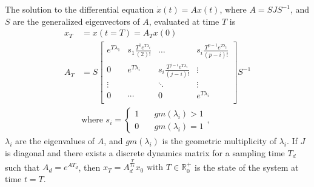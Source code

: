 \documentclass[sigconf]{llncs}
\newcommand{\mat}[1]{{#1}}
\renewcommand{\vec}[1]{{#1}}
\begin{document}
 \begin{lemma}
 The solution to the differential equation $\dot{\vec{x}}(t)=\mat{A}\vec{x}(t)$, where $\mat{A}=\mat{S}\mat{J}\mat{S}^{-1}$, and $\mat{S}$ are the generalized eigenvectors of $\mat{A}$,
 evaluated at time $T$ is
 \begin{align}
 \vec{x}_T&=\vec{x}(t=T)=\mat{A}_{T}\vec{x} (0)\\
 \mat{A}_{T}&= \mat{S}
 \left [ \begin{array}{cccc}
 e^{T\lambda_1}  & s_1\frac{T^{1}e^{T\lambda_i}}{(2)!} & \hdots  & s_i\frac{T^{p-1}e^{T\lambda_i}}{(p-i)!} \\
0 & e^{T\lambda_i}  & s_i\frac{T^{j-i}e^{T\lambda_i}}{(j-i)!} & \vdots \\
\vdots & & \ddots & \vdots \\
0 & \cdots & 0  &e^{T\lambda_i} \\
\end{array} \right ]
 \mat{S}^{-1}
 \label{eq:continuous_tube_dyn2}\\
 &\text{where } s_i=\left\{\begin{array}{cc}1&\quad gm(\lambda_i)>1\\0&\quad gm(\lambda_i)=1\end{array}\right.,\nonumber
 \end{align}
$\lambda_i$ are the eigenvalues of $\mat{A}$, and $gm(\lambda_i)$ is the geometric multiplicity of $\lambda_i$.  
 If $\mat{J}$ is diagonal and there exists a discrete dynamics matrix for a sampling time $T_d$ such that $A_d=e^{\mat{A} T_d}$, then $\vec{x}_T=A_d^{\frac{T}{T_d}}\vec{x}_0 \text{ with } T \in \mathbb{R}^+_0$ is the state of the system at time $t=T$. 
 \end{lemma}
\end{document}
